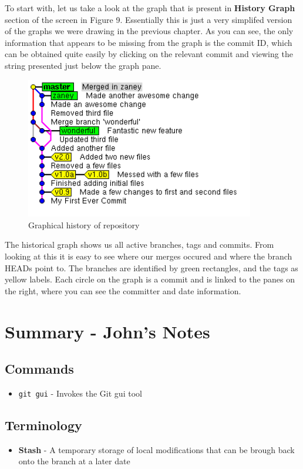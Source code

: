 To start with, let us take a look at the graph that is present in \textbf{History Graph} section of the screen in Figure 9.  Essentially this is just a very simplifed version of the graphs we were drawing in the previous chapter.  As you can see, the only information that appears to be missing from the graph is the commit ID, which can be obtained quite easily by clicking on the relevant commit and viewing the string presented just below the graph pane.

\begin{figure}[hbt]
\centering
\includegraphics[width=10cm]{images/f-w5-d9.png}
\caption{Graphical history of repository}
\end{figure} 

The historical graph shows us all active branches, tags and commits.  From looking at this it is easy to see where our merges occured and where the branch HEADs point to.  The branches are identified by green rectangles, and the tags as yellow labels.  Each circle on the graph is a commit and is linked to the panes on the right, where you can see the committer and date information.



\clearpage

\section{Summary - John's Notes}
\subsection{Commands}
\begin{itemize}

\item\texttt{git gui} - Invokes the Git gui tool

\end{itemize}

\subsection{Terminology}
\begin{itemize}
\item\textbf{Stash} - A temporary storage of local modifications that can be brough back onto the branch at a later date
\end{itemize}

